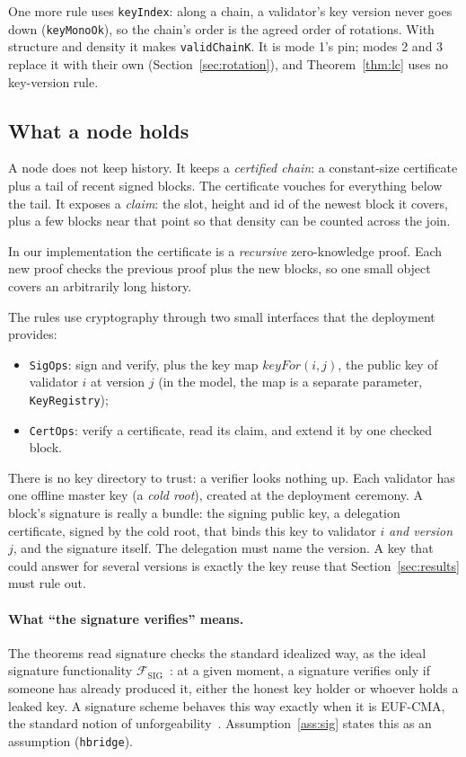 \documentclass[10pt]{article}
\DeclareRobustCommand{\code}[1]{{\renewcommand{\_}{\textunderscore\allowbreak}\texttt{#1}}}
\begin{document}
One more rule uses \code{keyIndex}: along a chain, a validator's key
version never goes down (\code{keyMonoOk}), so the chain's order is the
agreed order of rotations. With structure and density it makes
\code{validChainK}. It is mode 1's pin; modes 2 and 3 replace it with
their own (Section~\ref{sec:rotation}), and Theorem~\ref{thm:lc} uses no
key-version rule.

\subsection{What a node holds}

A node does not keep history. It keeps a \emph{certified chain}: a
constant-size certificate plus a tail of recent signed blocks. The
certificate vouches for everything below the tail. It exposes a
\emph{claim}: the slot, height and id of the newest block it covers,
plus a few blocks near that point so that density can be counted across
the join.

In our implementation the certificate is a \emph{recursive}
zero-knowledge proof. Each new proof checks the previous proof plus the
new blocks, so one small object covers an arbitrarily long history.

The rules use cryptography through two small interfaces that the
deployment provides:
\begin{itemize}
\item \code{SigOps}: sign and verify, plus the key map
  $\mathit{keyFor}(i,j)$, the public key of validator $i$ at version $j$
  (in the model, the map is a separate parameter, \code{KeyRegistry});
\item \code{CertOps}: verify a certificate, read its claim, and extend it
  by one checked block.
\end{itemize}

There is no key directory to trust: a verifier looks nothing up. Each
validator has one offline master key (a \emph{cold root}), created at the
deployment ceremony. A block's signature is really a bundle: the signing public key, a
delegation certificate, signed by the cold root, that binds this key to
validator $i$ \emph{and version $j$}, and the signature itself. The delegation must name the version. A key that could answer for
several versions is exactly the key reuse that Section~\ref{sec:results}
must rule out.

\paragraph{What ``the signature verifies'' means.} The theorems read
signature checks the standard idealized way, as the ideal signature
functionality $\mathcal{F}_{\mathrm{SIG}}$~\cite{canettisig}: at a given
moment, a signature verifies only if someone has already produced it,
either the honest key holder or whoever holds a leaked key. A signature
scheme behaves this way exactly when it is EUF-CMA, the standard notion
of unforgeability~\cite{canettisig}. Assumption~\ref{ass:sig} states this
as an assumption (\code{hbridge}).
\end{document}
